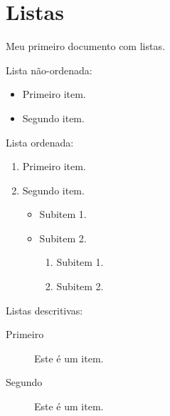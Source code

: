 \documentclass{article}
\begin{document}
	\section{Listas}
	Meu primeiro documento com listas.
	
	Lista não-ordenada:
	
	\begin{itemize}
		\item Primeiro item.
		\item Segundo item.
	\end{itemize}

	Lista ordenada:
	
	\begin{enumerate}
		\item Primeiro item.
		\item Segundo item.
			\begin{itemize}
				\item Subitem 1.
				\item Subitem 2.
					\begin{enumerate}
						\item Subitem 1.
						\item Subitem 2.
					\end{enumerate}
			\end{itemize}

	\end{enumerate}

	Listas descritivas:

	\begin{description}
		\item[Primeiro] Este é um item.
		\item[Segundo] Este é um item.
	\end{description}
\end{document}
